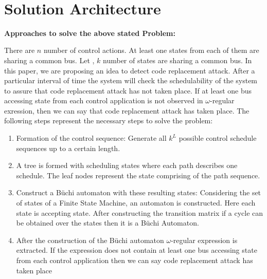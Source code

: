 \noindent
\\\section{Solution Architecture} \label{sec4}
\noindent
 

\textbf{ Approaches to solve the above stated Problem:}

  There are $n$ number of control actions. At least one states from each of them 
  are sharing a common bus. Let , $k$ number of states are sharing a common bus.
  In this paper, we are proposing an idea to   detect code replacement attack. 
  After a particular interval of time   the system will check the schedulability 
  of the system to assure that code   replacement attack has not taken place.
  If at least one bus accessing state from each control application is not observed
  in $\omega$-regular exression, then we can say that code replacement attack has 
  taken place. The following steps represent the necessary steps to solve the problem:
  
\begin{enumerate}
 \item Formation of the control sequence: Generate all  $k ^ L $ possible control 
       schedule sequences up to a certain length.

 \item A tree is formed with scheduling states where each path describes one schedule.
       The leaf nodes represent the state comprising of the path sequence.
      
 \item Construct a B\"{u}chi automaton with these resulting states: Considering the
       set of states of a Finite State Machine, an automaton
       is constructed. Here each state is accepting state. After constructing the
       transition matrix if a cycle can be obtained over the states then it is a 
       B\"{u}chi Automaton.
       
 \item After the construction of the B\"{u}chi automaton $\omega$-regular expression 
       is extracted. If the expression does not contain at least one bus accessing state from
       each control application then we can say code replacement attack has taken place
\end{enumerate}
   
\begin{figure}
\begin{center}
\end{center}
\label{fig:Algorithm}
\end{figure}

